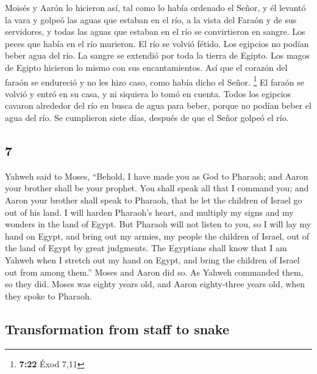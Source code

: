 \begin{paracol}{2}
 Moisés y Aarón lo hicieron así, tal como lo había
ordenado el Señor, y él levantó la vara y golpeó las aguas que estaban
en el río, a la vista del Faraón y de sus servidores, y todas las aguas
que estaban en el río se convirtieron en sangre.  Los
peces que había en el río murieron. El río se volvió fétido. Los
egipcios no podían beber agua del río. La sangre se extendió por toda la
tierra de Egipto.  Los magos de Egipto hicieron lo mismo
con sus encantamientos. Así que el corazón del faraón se endureció y no
les hizo caso, como había dicho el Señor. \footnote{\textbf{7:22} Éxod
  7,11}  El faraón se volvió y entró en su casa, y ni
siquiera lo tomó en cuenta.  Todos los egipcios cavaron
alrededor del río en busca de agua para beber, porque no podían beber el
agua del río.  Se cumplieron siete días, después de que
el Señor golpeó el río.

\switchcolumn
\begin{otherlanguage}{english}

\hypertarget{section-13}{%
\section{7}\label{section-13}}

 Yahweh said to Moses, ``Behold, I have made you as God to
Pharaoh; and Aaron your brother shall be your prophet. 
You shall speak all that I command you; and Aaron your brother shall
speak to Pharaoh, that he let the children of Israel go out of his land.
 I will harden Pharaoh's heart, and multiply my signs and
my wonders in the land of Egypt.  But Pharaoh will not
listen to you, so I will lay my hand on Egypt, and bring out my armies,
my people the children of Israel, out of the land of Egypt by great
judgments.  The Egyptians shall know that I am Yahweh when
I stretch out my hand on Egypt, and bring the children of Israel out
from among them.''  Moses and Aaron did so. As Yahweh
commanded them, so they did.  Moses was eighty years old,
and Aaron eighty-three years old, when they spoke to Pharaoh.

\hypertarget{transformation-from-staff-to-snake}{%
\subsection{Transformation from staff to
snake}\label{transformation-from-staff-to-snake}}


\end{otherlanguage}
\end{paracol}
